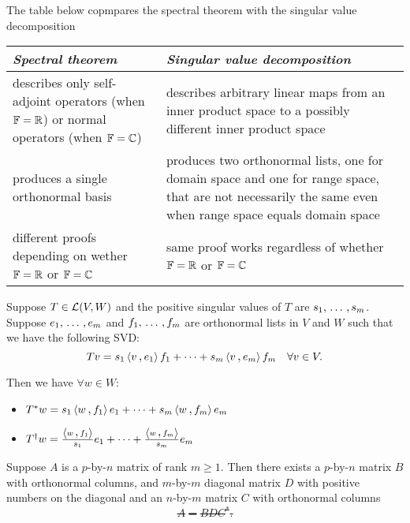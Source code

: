 The table below copmpares the spectral theorem with the singular value decomposition

\begin{tabular}{|p{}|p{}|}
  \hline
  \emph{Spectral theorem} & \emph{Singular value decomposition} \\
  \hline
  describes only self-adjoint operators (when $\mathbb{F} = \mathbb{R}$) or normal operators (when $\mathbb{F} = \mathbb{C}$) & describes arbitrary linear maps from an inner product space to a possibly different inner product space \\
  \hline
  produces a single orthonormal basis &
  produces two orthonormal lists, one for domain space and one for range space, that are not necessarily the same even when range space equals domain space \\
  \hline
  different proofs depending on wether $\mathbb{F} = \mathbb{R}$ or $\mathbb{F} = \mathbb{C}$ & same proof works regardless of whether $\mathbb{F} = \mathbb{R}$ or $\mathbb{F} = \mathbb{C}$ \\
  \hline
\end{tabular}

\begin{thm}
  \label{thm: singular value decomposition of adjoint and pseudoinverse}
  Suppose $T \in \mathcal{L}(V,W)$ and the positive singular values of $T$ are $s_1, {\, \ldots \,\,}, s_m$. Suppose $e_1, {\, \ldots \,\,}, e_m$ and $f_1, {\, \ldots \,\,}, f_m$ are orthonormal lists in $V$ and $W$ such that we have the following SVD:
  \[
    Tv = s_1 \ip{v}{e_1} f_1 + \cdots + s_m \ip{v}{e_m}f_m \quad \forall v \in V.
  \]

  Then we have $\forall w \in W$:
  \begin{itemize}
    \item $T^*w = s_1 \ip{w}{f_1}e_1 + \cdots + s_m \ip{w}{f_m}e_m$
    \item $T^\dagger w = \tfrac{\ip{w}{f_1}}{s_1} e_1 + \cdots + \tfrac{\ip{w}{f_m}}{s_m} e_m$
  \end{itemize}
\end{thm}

\begin{thm}
  Suppose $A$ is a $p$-by-$n$ matrix of rank $m \geq 1$. Then there exists a $p$-by-$n$ matrix $B$ with orthonormal columns, and $m$-by-$m$ diagonal matrix $D$ with positive numbers on the diagonal and an $n$-by-$m$ matrix $C$ with orthonormal columns \st
  \[
    A = BDC^*.
  \]
\end{thm}
